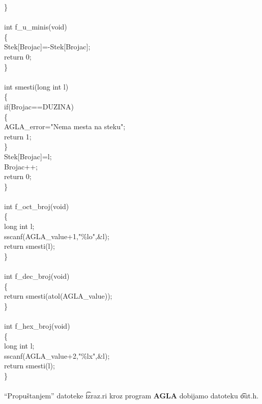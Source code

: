 {        \}\\
        \\
        int f\_u\_minis(void)\\
        \{\\
        {\s\s}Stek[Brojac]=-Stek[Brojac];\\
        {\s\s}return 0;\\
        \}\\
        \\
        int smesti(long int l)\\
        \{\\
        {\s\s}if(Brojac==DUZINA)\\
        {\s\s}\{\\
        {\s\s\s\s}AGLA\_error="Nema mesta na steku";\\
        {\s\s\s\s}return 1;\\
        {\s\s}\}\\
        {\s\s}Stek[Brojac]=l;\\
        {\s\s}Brojac++;\\
        {\s\s}return 0;\\
        \}\\
        \\
        int f\_oct\_broj(void)\\
        \{\\
        {\s\s}long int l;\\
        {\s\s}sscanf(AGLA\_value+1,"\%lo",\&l);\\
        {\s\s}return smesti(l);\\
        \}\\
        \\
        int f\_dec\_broj(void)\\
        \{\\
        {\s\s}return smesti(atol(AGLA\_value));\\
        \}\\
        \\
        int f\_hex\_broj(void)\\
        \{\\
        {\s\s}long int l;\\
        {\s\s}sscanf(AGLA\_value+2,"\%lx",\&l);\\
        {\s\s}return smesti(l);\\
        \}\\
      }\\
      ``Propu\v stanjem'' datoteke \t{izraz.ri} kroz program {\bf AGLA}
      dobijamo datoteku \t{out.h}.
